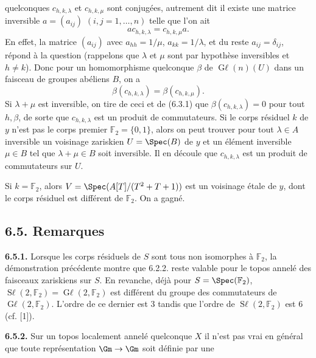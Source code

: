 quelconques \(c_{h,k,\lambda}\) et \(c_{h,k,\mu}\) sont conjugées, autrement dit il existe une matrice inversible \(a=(a_{ij})\) \((i,j=1,\ldots,n)\) telle que l'on ait
\[
 ac_{h,k,\lambda}=c_{h,k,\mu}a.
\]
En effet, la matrice \((a_{ij})\) avec \(a_{hh}=1/\mu\), \(a_{kk}=1/\lambda\), et du reste \(a_{ij}=\delta_{ij}\), répond à la question (rappelons que \(\lambda\) et \(\mu\) sont par hypothèse inversibles et \(h\ne k\)). Donc pour un homomorphisme quelconque \(\beta\) de \(\operatorname{G\ell}(n)(U)\) dans un faisceau de groupes abéliens \(B\), on a
\[
 \beta(c_{h,k,\lambda})=\beta(c_{h,k,\mu}).
\]
Si \(\lambda+\mu\) est inversible, on tire de ceci et de (6.3.1) que \(\beta(c_{h,k,\lambda})=0\) pour tout \(h,\beta\), de sorte que \(c_{h,k,\lambda}\) est un produit de commutateurs. Si le corps résiduel \(k\) de \(y\) n'est pas le corps premier \(\mathbb F_2=\{0,1\}\), alors on peut trouver pour tout \(\lambda\in A\) inversible un voisinage zariskien \(U=\Spec(B)\) de \(y\) et un élément inversible \(\mu\in B\) tel que \(\lambda+\mu\in B\) soit inversible. Il en découle que \(c_{h,k,\lambda}\) est un produit de commutateurs sur \(U\).

Si \(k=\mathbb F_2\), alors \(V=\Spec(A[T]/(T^2+T+1))\) est un voisinage étale de \(y\), dont le corps résiduel est différent de \(\mathbb F_2\). On a gagné.

\subsection*{6.5. Remarques}
\textbf{6.5.1.} Lorsque les corps résiduels de \(S\) sont tous non isomorphes à \(\mathbb F_2\), la démonstration précédente montre que 6.2.2. reste valable pour le topos annelé des faisceaux zariskiens sur \(S\). En revanche, déjà pour \(S=\Spec(\mathbb F_2)\), \(\operatorname{S\ell}(2,\mathbb F_2)=\operatorname{G\ell}(2,\mathbb F_2)\) est différent du groupe des commutateurs de \(\operatorname{G\ell}(2,\mathbb F_2)\). L'ordre de ce dernier est \(3\) tandis que l'ordre de \(\operatorname{S\ell}(2,\mathbb F_2)\) est \(6\) (cf. [1]).

\textbf{6.5.2.} Sur un topos localement annelé quelconque \(X\) il n'est pas vrai en général que toute représentation \(\Gm\to\Gm\) soit définie par une

